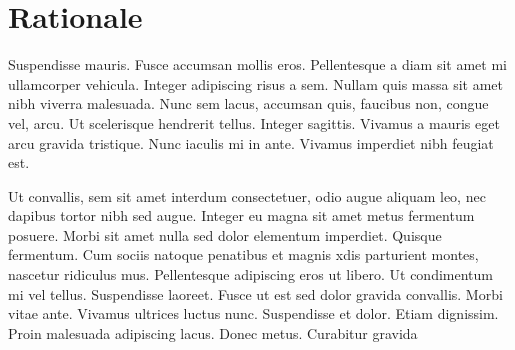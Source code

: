 \section{Rationale}

Suspendisse mauris. Fusce accumsan mollis eros. Pellentesque a diam sit amet mi ullamcorper vehicula. Integer adipiscing risus a sem. Nullam quis massa sit amet nibh viverra malesuada. Nunc sem lacus, accumsan quis, faucibus non, congue vel, arcu. Ut scelerisque hendrerit tellus. Integer sagittis. Vivamus a mauris eget arcu gravida tristique. Nunc iaculis mi in ante. Vivamus imperdiet nibh feugiat est.

Ut convallis, sem sit amet interdum consectetuer, odio augue aliquam leo, nec dapibus tortor nibh sed augue. Integer eu magna sit amet metus fermentum posuere. Morbi sit amet nulla sed dolor elementum imperdiet. Quisque fermentum. Cum sociis natoque penatibus et magnis xdis parturient montes, nascetur ridiculus mus. Pellentesque adipiscing eros ut libero. Ut condimentum mi vel tellus. Suspendisse laoreet. Fusce ut est sed dolor gravida convallis. Morbi vitae ante. Vivamus ultrices luctus nunc. Suspendisse et dolor. Etiam dignissim. Proin malesuada adipiscing lacus. Donec metus. Curabitur gravida